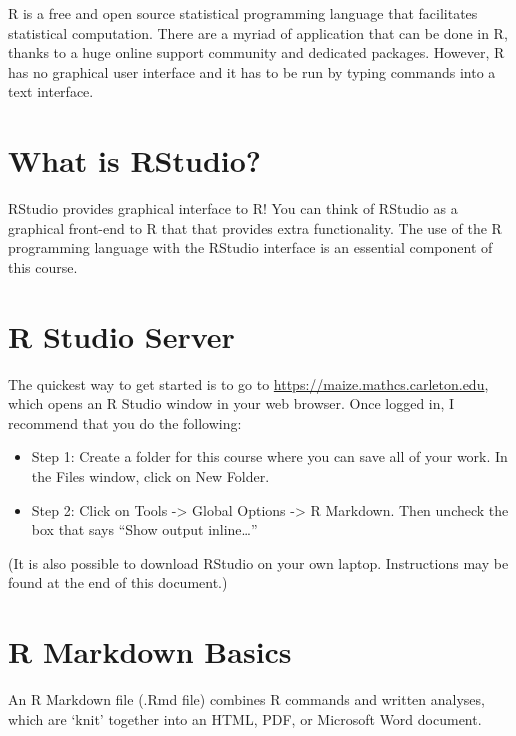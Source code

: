 \documentclass[
]{book}
\providecommand{\tightlist}{%
  \setlength{\itemsep}{0pt}\setlength{\parskip}{0pt}}
\begin{document}
R is a free and open source statistical programming language that facilitates statistical computation. There are a myriad of application that can be done in R, thanks to a huge online support community and dedicated packages. However, R has no graphical user interface and it has to be run by typing commands into a text interface.

\hypertarget{what-is-rstudio}{%
\section{What is RStudio?}\label{what-is-rstudio}}

RStudio provides graphical interface to R! You can think of RStudio as a graphical front-end to R that that provides extra functionality. The use of the R programming language with the RStudio interface is an essential component of this course.

\hypertarget{r-studio-server}{%
\section{R Studio Server}\label{r-studio-server}}

The quickest way to get started is to go to \url{https://maize.mathcs.carleton.edu}, which opens an R Studio window in your web browser. Once logged in, I recommend that you do the following:

\begin{itemize}
\tightlist
\item
  Step 1: Create a folder for this course where you can save all of your work. In the Files window, click on New Folder.
\item
  Step 2: Click on Tools -\textgreater{} Global Options -\textgreater{} R Markdown. Then uncheck the box that says ``Show output inline\ldots{}''
\end{itemize}

(It is also possible to download RStudio on your own laptop. Instructions may be found at the end of this document.)

\hypertarget{r-markdown-basics}{%
\section{R Markdown Basics}\label{r-markdown-basics}}

An R Markdown file (.Rmd file) combines R commands and written analyses, which are `knit' together into an HTML, PDF, or Microsoft Word document.
\end{document}
